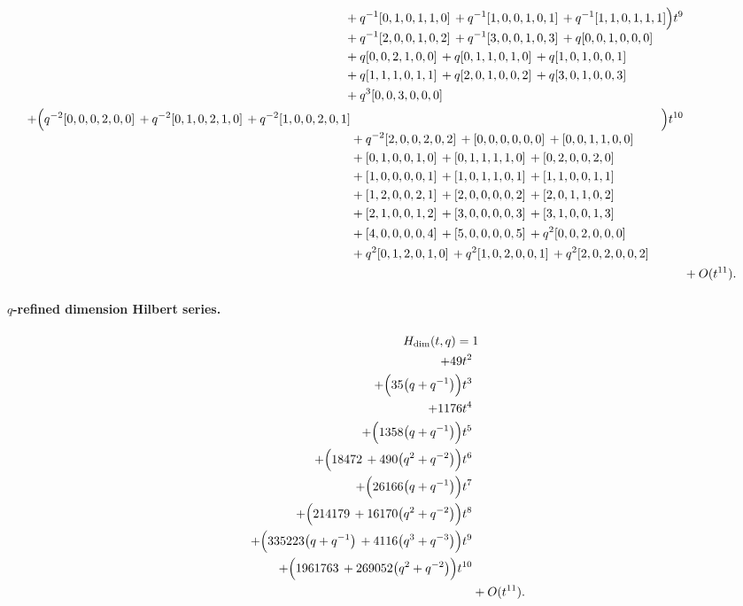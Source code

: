 \documentclass[10pt]{article}
\begin{document}
\[\begin{aligned}
\begin{aligned}[t]
  &{}+q^{-1}[0,1,0,1,1,0]\,+q^{-1}[1,0,0,1,0,1]\,+q^{-1}[1,1,0,1,1,1] \\
  &{}+q^{-1}[2,0,0,1,0,2]\,+q^{-1}[3,0,0,1,0,3]\,+q[0,0,1,0,0,0] \\
  &{}+q[0,0,2,1,0,0]\,+q[0,1,1,0,1,0]\,+q[1,0,1,0,0,1] \\
  &{}+q[1,1,1,0,1,1]\,+q[2,0,1,0,0,2]\,+q[3,0,1,0,0,3] \\
  &{}+q^{3}[0,0,3,0,0,0]\end{aligned}\Bigr)t^{9} \\
  + \Bigl(\begin{aligned}[t]q^{-2}[0,0,0,2,0,0]\,+q^{-2}[0,1,0,2,1,0]\,+q^{-2}[1,0,0,2,0,1] \\
  &{}+q^{-2}[2,0,0,2,0,2]\,+[0,0,0,0,0,0]\,+[0,0,1,1,0,0] \\
  &{}+[0,1,0,0,1,0]\,+[0,1,1,1,1,0]\,+[0,2,0,0,2,0] \\
  &{}+[1,0,0,0,0,1]\,+[1,0,1,1,0,1]\,+[1,1,0,0,1,1] \\
  &{}+[1,2,0,0,2,1]\,+[2,0,0,0,0,2]\,+[2,0,1,1,0,2] \\
  &{}+[2,1,0,0,1,2]\,+[3,0,0,0,0,3]\,+[3,1,0,0,1,3] \\
  &{}+[4,0,0,0,0,4]\,+[5,0,0,0,0,5]\,+q^{2}[0,0,2,0,0,0] \\
  &{}+q^{2}[0,1,2,0,1,0]\,+q^{2}[1,0,2,0,0,1]\,+q^{2}[2,0,2,0,0,2]\end{aligned}\Bigr)t^{10} \\
  &+ O(t^{11}).
\end{aligned}
\]
\paragraph{$q$-refined dimension Hilbert series.}
\[
\begin{aligned}
H_{\mathrm{dim}}(t,q) ={}&
   1 \\
  + 49t^{2} \\
  + \Bigl(35\bigl(q+q^{-1}\bigr)\Bigr)t^{3} \\
  + 1176t^{4} \\
  + \Bigl(1358\bigl(q+q^{-1}\bigr)\Bigr)t^{5} \\
  + \Bigl(18472\,+490\bigl(q^{2}+q^{-2}\bigr)\Bigr)t^{6} \\
  + \Bigl(26166\bigl(q+q^{-1}\bigr)\Bigr)t^{7} \\
  + \Bigl(214179\,+16170\bigl(q^{2}+q^{-2}\bigr)\Bigr)t^{8} \\
  + \Bigl(335223\bigl(q+q^{-1}\bigr)\,+4116\bigl(q^{3}+q^{-3}\bigr)\Bigr)t^{9} \\
  + \Bigl(1961763\,+269052\bigl(q^{2}+q^{-2}\bigr)\Bigr)t^{10} \\
  &+ O(t^{11}).
\end{aligned}
\]
\end{document}
